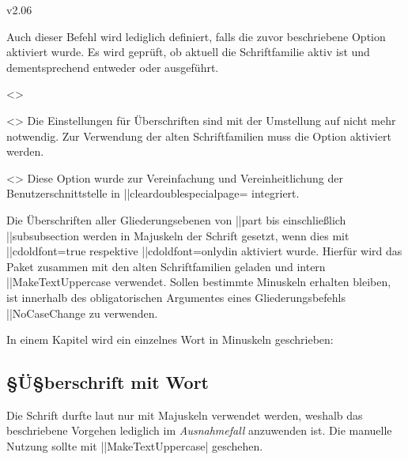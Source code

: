 \begin{Changes}{v2.06}
\begin{Obsolete}
  {}
\printdeclarationlist
%
Auch dieser Befehl wird lediglich definiert, falls die zuvor beschriebene 
Option  aktiviert wurde. Es wird geprüft, ob aktuell die 
Schriftfamilie \DIN aktiv ist und dementsprechend entweder  
oder  ausgeführt. 
\end{Obsolete}

\begin{Obsolete}
  {}
  <>
\begin{Obsolete}
  {}
  <>
\printdeclarationlist
%
Die Einstellungen für Überschriften sind mit der Umstellung auf \OpenSans nicht 
mehr notwendig. Zur Verwendung der alten Schriftfamilien muss die Option 
 aktiviert werden.
\end{Obsolete}
\end{Obsolete}

\begin{Obsolete}
  {}
  <>
\printdeclarationlist
%
Diese Option wurde zur Vereinfachung und Vereinheitlichung der 
Benutzerschnittstelle in \Option||{cleardoublespecialpage=\PMisc} integriert.
\end{Obsolete}



%
Die Überschriften aller Gliederungsebenen von \Macro||{part} bis einschließlich 
\Macro||{subsubsection} werden in Majuskeln der Schrift \DIN gesetzt, wenn dies 
mit \Option||{cdoldfont=true} respektive \Option||{cdoldfont=onlydin} aktiviert 
wurde. Hierfür wird das Paket  zusammen mit den alten 
Schriftfamilien geladen und intern \Macro||{MakeTextUppercase} verwendet. 
Sollen bestimmte Minuskeln erhalten bleiben, ist innerhalb des obligatorischen 
Argumentes eines Gliederungsbefehls \Macro||{NoCaseChange} zu verwenden.
%
\begin{Example}
In einem Kapitel wird ein einzelnes Wort in Minuskeln geschrieben:
\begin{Code}[escapechar=§]
\chapter{§Ü§berschrift mit  Wort}
\end{Code}
\end{Example}
%
Die Schrift \DIN durfte laut \CD nur mit Majuskeln verwendet werden, weshalb 
das beschriebene Vorgehen lediglich im \emph{Ausnahmefall} anzuwenden ist. 
Die manuelle Nutzung sollte mit 
\Macro||{MakeTextUppercase|} 
geschehen.%
\end{Changes}


